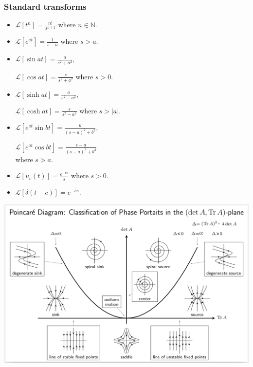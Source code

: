 \documentclass{article}
\begin{document}
\begin{multicols}{3}
\subsubsection*{Standard transforms}
\begin{itemize}
    \item $\displaystyle\mathcal{L}
    [t^n]=\frac{n!}{s^{n+1}}$
    where $n\in\mathbb{N}$.

    \item $\displaystyle\mathcal{L}
    [e^{at}]=\frac{1}{s-a}$
    where $s>a$.

    \item $\displaystyle\mathcal{L}
    [\sin at]=\frac{a}{s^2+a^2}$,
    
    $\displaystyle\mathcal{L}
    [\cos at]=\frac{s}{s^2+a^2}$
    where $s>0$.

    \item $\displaystyle\mathcal{L}
    [\sinh at]=\frac{a}{s^2-a^2}$,

    $\displaystyle\mathcal{L}
    [\cosh at]=\frac{s}{s^2-a^2}$
    where $s>|a|$.

    \item $\displaystyle\mathcal{L}
    [e^{at}\sin bt]=\frac{b}{(s-a)^2+b^2}$,

    $\displaystyle\mathcal{L}
    [e^{at}\cos bt]=\frac{s-a}{(s-a)^2+b^2}$ \\
    where $s>a$.

    \item $\displaystyle\mathcal{L}
    [u_c(t)]=\frac{e^{-cs}}{s}$
    where $s>0$.

    \item $\displaystyle\mathcal{L}
    [\delta(t-c)]=e^{-cs}$.
\end{itemize}
\end{multicols}
\begin{center}
    \includegraphics*[scale=0.5]{f2.png}
\end{center}
\end{document}
